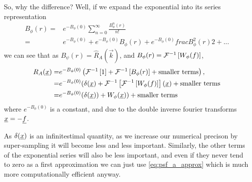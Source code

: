 So, why the difference? Well, if we expand the exponential into its series representation
\begin{align*}
	B_\phi(r) =& e^{-B_\phi(0)} \sum_{n=0}^{\infty} \frac{B_\phi^n(r)}{n!} \\
		=& e^{-B_\phi(0)} + e^{-B_\phi(0)} B_\phi(r) + e^{-B_\phi(0)} frac{B^2_\phi(r)}{2} + ...
\end{align*}
we can see that as $B_\psi(r) = \hat{R}_A(\vec{k})$, and $B_\phi(r) = \mathcal{F}^{-1}\left[ W_\phi(f) \right]$,
\begin{align*}
	R_A(\underline{x}) =& e^{-B_\phi(0)} \left(\mathcal{F}^{-1}\left[ 1 \right] + \mathcal{F}^{-1}\left[ B_\phi(r) \right] + \textrm{smaller terms} \right), \\
		=& e^{-B_\phi(0)}(\delta(\underline{x}) + \mathcal{F}^{-1}\left[ \mathcal{F}^{-1}\left[ W_\phi(f) \right] \right](\underline{x}) + \textrm{smaller terms} \\
		=& e^{-B_\phi(0)}(\delta(\underline{x})) + W_\phi(\underline{x})) + \textrm{smaller terms}
\end{align*}
where $e^{-B_\phi(0)}$ is a constant, and due to the double inverse fourier transforms $\underline{x} = -\underline{f}$.

As $\delta(\underline{x})$ is an infinitestimal quantity, as we increase our numerical precison by super-sampling it will become less and less important. Similarly, the other terms of the exponential series will also be less important, and even if they never tend to zero as a first approximation we can just use \eqref{eq:psf_a_approx} which is much more computationally efficient anyway.





